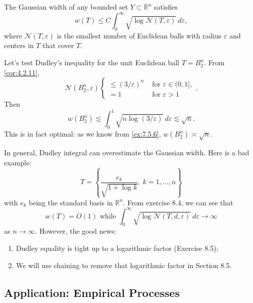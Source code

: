 \begin{theorem}
\label{thm:8.1.8}
The Gaussian width of any bounded set $Y \subset \mathbb{R}^n$ satisfies 
\[ w(T) \leq C \int_{0}^{\infty} \sqrt{\log_{}{\mathcal{N}(T, \varepsilon)}} \ d \varepsilon, \]
where $\mathcal{N}(T, \varepsilon)$ is the smallest number of Euclidean balls with radius $\varepsilon$ and 
centers in $T$ that cover $T$.
\end{theorem}

\begin{example}
\label{ex:8.1.9}
Let's test Dudley's inequality for the unit Euclidean ball $T = B_2^n$. From \cref{cor:4.2.11}, 
\[ \mathcal{N}(B_2^n, \varepsilon) \begin{cases}
	\leq (3 / \varepsilon)^n &\text{ for } \varepsilon \in (0, 1], \\
	= 1 &\text{ for } \varepsilon > 1
\end{cases}. \]
Then 
\[ w(B_2^n) \lesssim \int_{0}^{1} \sqrt{n \log_{}{(3 / \varepsilon)}} \ d \varepsilon \lesssim \sqrt{n}. \]
This is in fact optimal: as we know from \cref{ex:7.5.6}, $w(B_2^n) \asymp \sqrt{n}$.
\end{example}

\begin{remark}
\label{rmk:8.1.10}
In general, Dudley integral can overestimate the Gaussian width. Here is a bad example: 
\[ T = \left\{ \frac{e_k}{\sqrt{1 + \log_{}{k}}}, \ k = 1, \dots, n \right\} \]
with $e_k$ being the standard basis in $\mathbb{R}^n$. From exercise 8.4, we can see that 
\[ w(T) = O(1) \text{ while } \int_{0}^{\infty} \sqrt{\log_{}{\mathcal{N}(T, d, \varepsilon)}} \ d \varepsilon 
\to \infty \]
as $n \to \infty$. However, the good news:
\begin{enumerate}
	\item Dudley equality is tight up to a logarithmic factor (Exercise 8.5);
	\item We will use chaining to remove that logarithmic factor in Section 8.5.
\end{enumerate}
\end{remark}


\subsection{Application: Empirical Processes}



